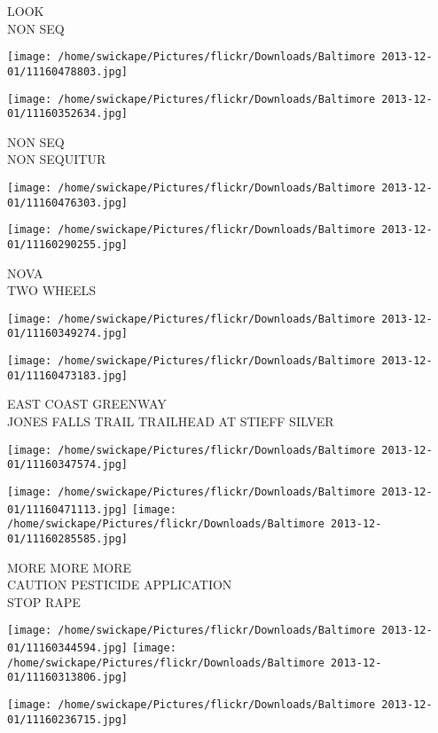 \documentclass[10pt,letterpaper]{article}
\begin{document}
LOOK\\
NON SEQ
\pagebreak

\texttt{[image: /home/swickape/Pictures/flickr/Downloads/Baltimore 2013-12-01/11160478803.jpg]}

\vspace{0.25in}
\texttt{[image: /home/swickape/Pictures/flickr/Downloads/Baltimore 2013-12-01/11160352634.jpg]}

NON SEQ\\
NON SEQUITUR
\pagebreak

\texttt{[image: /home/swickape/Pictures/flickr/Downloads/Baltimore 2013-12-01/11160476303.jpg]}

\vspace{0.25in}
\texttt{[image: /home/swickape/Pictures/flickr/Downloads/Baltimore 2013-12-01/11160290255.jpg]}

NOVA\\
TWO WHEELS
\pagebreak

\texttt{[image: /home/swickape/Pictures/flickr/Downloads/Baltimore 2013-12-01/11160349274.jpg]}

\vspace{0.25in}
\texttt{[image: /home/swickape/Pictures/flickr/Downloads/Baltimore 2013-12-01/11160473183.jpg]}

EAST COAST GREENWAY\\
JONES FALLS TRAIL TRAILHEAD AT STIEFF SILVER
\pagebreak

\texttt{[image: /home/swickape/Pictures/flickr/Downloads/Baltimore 2013-12-01/11160347574.jpg]}

\vspace{0.25in}
\texttt{[image: /home/swickape/Pictures/flickr/Downloads/Baltimore 2013-12-01/11160471113.jpg]}
\texttt{[image: /home/swickape/Pictures/flickr/Downloads/Baltimore 2013-12-01/11160285585.jpg]}

MORE MORE MORE\\
CAUTION PESTICIDE APPLICATION\\
STOP RAPE
\pagebreak

\texttt{[image: /home/swickape/Pictures/flickr/Downloads/Baltimore 2013-12-01/11160344594.jpg]}
\texttt{[image: /home/swickape/Pictures/flickr/Downloads/Baltimore 2013-12-01/11160313806.jpg]}

\texttt{[image: /home/swickape/Pictures/flickr/Downloads/Baltimore 2013-12-01/11160236715.jpg]}
\end{document}
